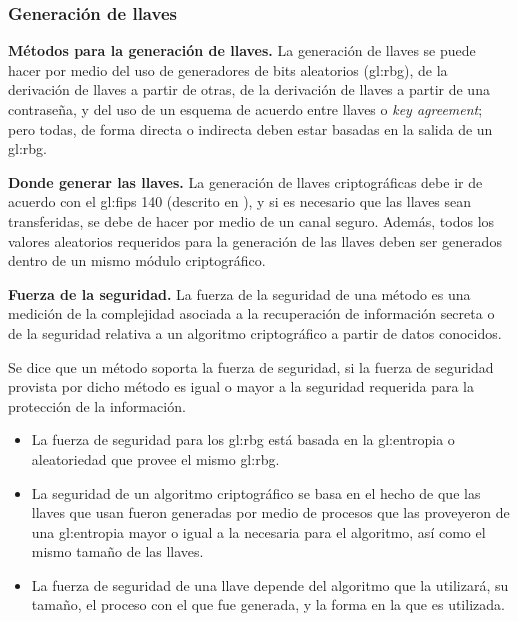 %
%

\subsubsection{Generación de llaves}
\label{sec:generacion_llaves}


\textbf{Métodos para la generación de llaves.}
La generación de llaves se puede hacer por medio del uso de generadores de 
bits aleatorios (\gls{gl:rbg}), de la derivación de llaves a partir de otras, 
de la derivación de llaves a partir de una contraseña, y del uso de un esquema 
de acuerdo entre llaves o \textit{key agreement}; pero todas, de forma directa 
o indirecta deben estar basadas en la salida de un \gls{gl:rbg}.

\textbf{Donde generar las llaves.}
La generación de llaves criptográficas debe ir de acuerdo con el \gls{gl:fips} 
140 (descrito en \cite{nist_modulos_criptograficos}), y si es necesario que 
las llaves sean transferidas, se debe de hacer por medio de un canal seguro. 
Además, todos los valores aleatorios requeridos para la generación de las 
llaves deben ser generados dentro de un mismo módulo criptográfico.

\textbf{Fuerza de la seguridad.}
La fuerza de la seguridad de una método es una medición de la complejidad 
asociada a la recuperación de información secreta o de la seguridad relativa 
a un algoritmo criptográfico a partir de datos conocidos.

Se dice que un método soporta la fuerza de seguridad, si la fuerza de 
seguridad provista por dicho método es igual o mayor a la seguridad 
requerida para la protección de la información.
\begin{itemize}

  \item La fuerza de seguridad para los \gls{gl:rbg} está basada en la 
    \gls{gl:entropia} o aleatoriedad que provee el mismo \gls{gl:rbg}.

  \item La seguridad de un algoritmo criptográfico se basa en el hecho de 
    que las llaves que usan fueron generadas por medio de procesos que las 
    proveyeron de una \gls{gl:entropia} mayor o igual a la necesaria para el 
    algoritmo, así como el mismo tamaño de las llaves.

  \item La fuerza de seguridad de una llave depende del algoritmo que la 
    utilizará, su tamaño, el proceso con el que fue generada, y la forma en 
    la que es utilizada.

\end{itemize}

